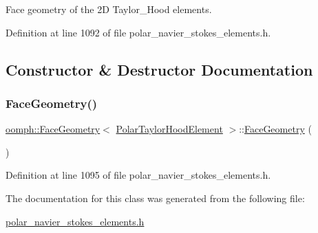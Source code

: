Face geometry of the 2D Taylor\+\_\+\+Hood elements. 

Definition at line 1092 of file polar\+\_\+navier\+\_\+stokes\+\_\+elements.\+h.



\subsection{Constructor \& Destructor Documentation}
\mbox{\label{classoomph_1_1FaceGeometry_3_01PolarTaylorHoodElement_01_4_afd83be3036e0f17a9c78bb4082393ebc}} 
\subsubsection{\texorpdfstring{Face\+Geometry()}{FaceGeometry()}}
{\footnotesize\ttfamily \hyperlink{classoomph_1_1FaceGeometry}{oomph\+::\+Face\+Geometry}$<$ \hyperlink{classoomph_1_1PolarTaylorHoodElement}{Polar\+Taylor\+Hood\+Element} $>$\+::\hyperlink{classoomph_1_1FaceGeometry}{Face\+Geometry} (\begin{DoxyParamCaption}{ }\end{DoxyParamCaption})\hspace{0.3cm}{\ttfamily [inline]}}



Definition at line 1095 of file polar\+\_\+navier\+\_\+stokes\+\_\+elements.\+h.



The documentation for this class was generated from the following file\+:\begin{DoxyCompactItemize}
\item 
\hyperlink{polar__navier__stokes__elements_8h}{polar\+\_\+navier\+\_\+stokes\+\_\+elements.\+h}\end{DoxyCompactItemize}
